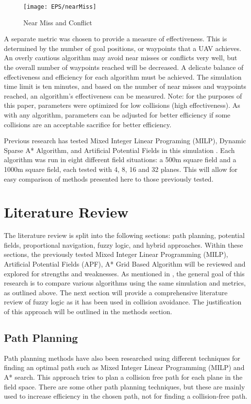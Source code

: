\documentclass[10pt, conference, compsocconf]{IEEEtran}
\begin{document}
\begin{figure}[position here]
\centering
\texttt{[image: EPS/nearMiss]}
\caption{Near Miss and Conflict}
\label{fig:nearMissAndConflict}
\end{figure}

A separate metric was chosen to provide a measure of effectiveness. This is determined by the number of goal positions, or waypoints that a UAV achieves. An overly cautious algorithm may avoid near misses or conflicts very well, but the overall number of waypoints reached will be decreased. A delicate balance of effectiveness and efficiency for each algorithm must be achieved. The simulation time limit is ten minutes, and based on the number of near misses and waypoints reached, an algorithm's effectiveness can be measured. Note: for the purposes of this paper, parameters were optimized for low collisions (high effectiveness). As with any algorithm, parameters can be adjusted for better efficiency if some collisions are an acceptable sacrifice for better efficiency.

Previous research has tested Mixed Integer Linear Programing (MILP), Dynamic Sparse A* Algorithm, and Artificial Potential Fields in this simulation \cite{holtthesis}.  Each algorithm was run in eight different field situations: a 500m square field and a 1000m square field, each tested with 4, 8, 16 and 32 planes.  This will allow for easy comparison of methods presented here to those previously tested.
 
\section{Literature Review}
The literature review is split into the following sections: path planning, potential fields, proportional navigation, fuzzy logic, and hybrid approaches. Within these sections, the previously tested Mixed Integer Linear Programming (MILP), Artificial Potential Fields (APF), A* Grid Based Algorithm will be  reviewed and explored for strengths and weaknesses.  As mentioned in \cite{holtthesis},  the general goal of this research is to compare various algorithms using the same simulation and metrics, as outlined above. The next section will provide a comprehensive literature review of fuzzy logic as it has been used in collision avoidance.  The justification of this approach will be outlined in the methods section.

\subsection{Path Planning}
Path planning methods have also been researched using different techniques for finding an optimal path such as Mixed Integer Linear Programming (MILP) and A* search.  This approach tries to plan a collision free path for each plane in the field space. There are some other path planning techniques, but these are mainly used to increase efficiency in the chosen path, not for finding a collision-free path.
\end{document}
